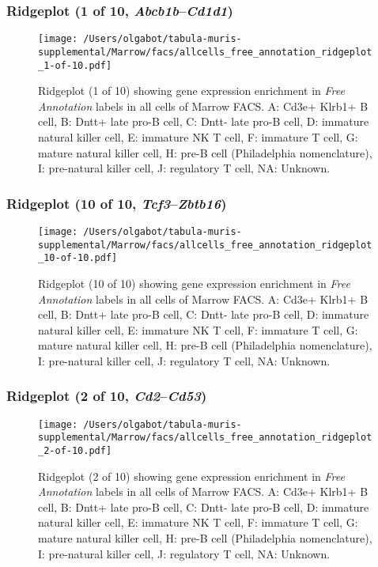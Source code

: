 \clearpage

\subsubsection{Ridgeplot (1 of 10, \emph{Abcb1b}--\emph{Cd1d1})}
\begin{figure}[h]
\centering
\texttt{[image: /Users/olgabot/tabula-muris-supplemental/Marrow/facs/allcells\_free\_annotation\_ridgeplot\_1-of-10.pdf]}

\caption{ Ridgeplot (1 of 10)  showing gene expression enrichment in \emph{Free Annotation} labels in all cells of Marrow FACS. A: Cd3e+ Klrb1+ B cell, B: Dntt+ late pro-B cell, C: Dntt- late pro-B cell, D: immature natural killer cell, E: immature NK T cell, F: immature T cell, G: mature natural killer cell, H: pre-B cell (Philadelphia nomenclature), I: pre-natural killer cell, J: regulatory T cell, NA: Unknown.}
\end{figure}


\clearpage

\subsubsection{Ridgeplot (10 of 10, \emph{Tcf3}--\emph{Zbtb16})}
\begin{figure}[h]
\centering
\texttt{[image: /Users/olgabot/tabula-muris-supplemental/Marrow/facs/allcells\_free\_annotation\_ridgeplot\_10-of-10.pdf]}

\caption{ Ridgeplot (10 of 10)  showing gene expression enrichment in \emph{Free Annotation} labels in all cells of Marrow FACS. A: Cd3e+ Klrb1+ B cell, B: Dntt+ late pro-B cell, C: Dntt- late pro-B cell, D: immature natural killer cell, E: immature NK T cell, F: immature T cell, G: mature natural killer cell, H: pre-B cell (Philadelphia nomenclature), I: pre-natural killer cell, J: regulatory T cell, NA: Unknown.}
\end{figure}


\clearpage

\subsubsection{Ridgeplot (2 of 10, \emph{Cd2}--\emph{Cd53})}
\begin{figure}[h]
\centering
\texttt{[image: /Users/olgabot/tabula-muris-supplemental/Marrow/facs/allcells\_free\_annotation\_ridgeplot\_2-of-10.pdf]}

\caption{ Ridgeplot (2 of 10)  showing gene expression enrichment in \emph{Free Annotation} labels in all cells of Marrow FACS. A: Cd3e+ Klrb1+ B cell, B: Dntt+ late pro-B cell, C: Dntt- late pro-B cell, D: immature natural killer cell, E: immature NK T cell, F: immature T cell, G: mature natural killer cell, H: pre-B cell (Philadelphia nomenclature), I: pre-natural killer cell, J: regulatory T cell, NA: Unknown.}
\end{figure}


